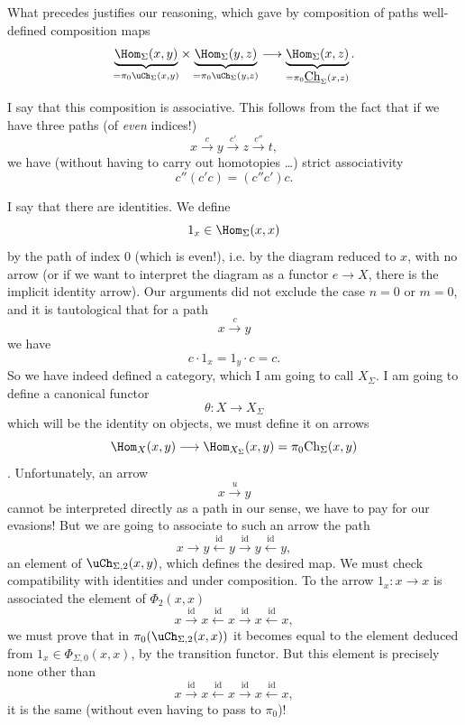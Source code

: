 What precedes justifies our reasoning, which gave by composition of paths well-defined composition maps
\[
\underbrace{\Hom_\Sigma(x,y)}_{=\pi_0\uCh_\Sigma(x,y)} \times \underbrace{\Hom_\Sigma(y,z)}_{=\pi_0\uCh_\Sigma(y,z)} \longrightarrow \underbrace{\Hom_\Sigma(x,z)}_{=\pi_0\underline{\textstyle\mathrm{Ch}}_\Sigma(x,z)}.
\]

I say that this composition is associative. This follows from the fact that if we have three paths (of \textit{even} indices!)
\[
x \xrightarrow{c} y \xrightarrow{c'} z \xrightarrow{c''} t,
\]
we have (without having to carry out homotopies \dots) strict associativity
\[
c''(c'c) = (c''c')c.
\]

I say that there are identities. We define
\[
1_x \in \Hom_\Sigma(x,x)
\]
by the path of index 0 (which is even!), i.e. by the diagram reduced to $x$, with no arrow (or if we want to interpret the diagram as a functor $e \longrightarrow X$, there is the implicit identity arrow). Our arguments did not exclude the case $n = 0$ or $m = 0$, and it is tautological that for a path
\[
x \xrightarrow{c} y
\]
we have
\[
c \cdot 1_x = 1_y \cdot c = c.
\]
So we have indeed defined a category, which I am going to call $X_\Sigma$. I am going to define a canonical functor %
\[
\theta : X \longrightarrow X_\Sigma
\]
which will be the identity on objects, we must define it on arrows
\[
\Hom_X(x,y) \longrightarrow \Hom_{X_\Sigma}(x,y) = \pi_0\mathrm{Ch}_\Sigma(x,y)
\]
. Unfortunately, an arrow
\[
x \xrightarrow{u} y
\]
cannot be interpreted directly as a path in our sense, we have to pay for our evasions! But we are going to associate to such an arrow the path
\[
x \longrightarrow y \xleftarrow{\mathrm{id}} y \xrightarrow{\mathrm{id}} y \xleftarrow{\mathrm{id}} y,
\]
an element of $\uCh_{\Sigma,2}(x,y)$, which defines the desired map. We must check compatibility with identities and under composition. To the arrow $1_x : x \longrightarrow x$ is associated the element of $\Phi_2(x,x)$
\[
x \xrightarrow{\mathrm{id}} x \xleftarrow{\mathrm{id}} x \xrightarrow{\mathrm{id}} x \xleftarrow{\mathrm{id}} x,
\]
we must prove that in $\pi_0(\uCh_{\Sigma,2}(x,x))$ it becomes equal to the element deduced from $1_x \in \Phi_{\Sigma,0}(x,x)$, by the transition functor. But this element is precisely none other than
\[
x \xrightarrow{\mathrm{id}} x \xleftarrow{\mathrm{id}} x \xrightarrow{\mathrm{id}} x \xleftarrow{\mathrm{id}} x,
\]
it is the same (without even having to pass to $\pi_0$)!

